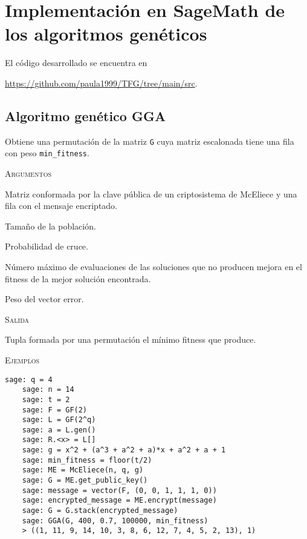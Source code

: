 \chapter[Implementación en SageMath de los algoritmos genéticos]{Implementación en SageMath de los algoritmos genéticos}
\label{annex:sage-geneticos}


El código desarrollado se encuentra en
\begin{center}
\url{https://github.com/paula1999/TFG/tree/main/src}.
\end{center}

\section{Algoritmo genético GGA}

\begin{description}[leftmargin=1em, font=\normalfont\ttfamily, style=nextline]
  \item[GGA(G, N, pc, max\_reinit, min\_fitness)] Obtiene una permutación de la matriz \texttt{G} cuya matriz escalonada tiene una fila con peso \texttt{min\_fitness}.

  \textsc{Argumentos}
  \begin{description}[font=\normalfont\ttfamily]
    \item[G] Matriz conformada por la clave pública de un criptosistema de McEliece y una fila con el mensaje encriptado.
    \item[N] Tamaño de la población.
    \item[pc] Probabilidad de cruce.
    \item[max\_reinit] Número máximo de evaluaciones de las soluciones que no producen mejora en el fitness de la mejor solución encontrada.
    \item[min\_fitness] Peso del vector error. 
  \end{description}

  \textsc{Salida}
  \begin{description}[font=\normalfont\ttfamily]
    \item[] Tupla formada por una permutación el mínimo fitness que produce.
  \end{description}

  \textsc{Ejemplos}
  \begin{lstlisting}[gobble=4]
    sage: q = 4
    sage: n = 14
    sage: t = 2
    sage: F = GF(2)
    sage: L = GF(2^q)
    sage: a = L.gen()
    sage: R.<x> = L[]
    sage: g = x^2 + (a^3 + a^2 + a)*x + a^2 + a + 1
    sage: min_fitness = floor(t/2)
    sage: ME = McEliece(n, q, g)
    sage: G = ME.get_public_key()
    sage: message = vector(F, (0, 0, 1, 1, 1, 0))
    sage: encrypted_message = ME.encrypt(message)
    sage: G = G.stack(encrypted_message)
    sage: GGA(G, 400, 0.7, 100000, min_fitness)
    > ((1, 11, 9, 14, 10, 3, 8, 6, 12, 7, 4, 5, 2, 13), 1)
  \end{lstlisting}
\end{description}

